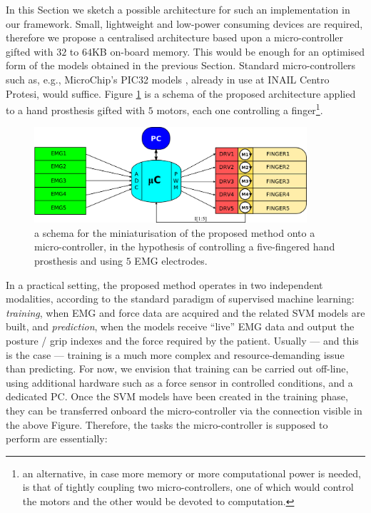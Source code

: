In this Section we sketch a possible architecture for such an
implementation in our framework. Small, lightweight and low-power
consuming devices are required, therefore we propose a centralised
architecture based upon a micro-controller gifted with $32$ to $64$KB
on-board memory. This would be enough for an optimised form of the
models obtained in the previous Section. Standard micro-controllers
such as, e.g., MicroChip's PIC32 models \cite{mc}, already in use at
INAIL Centro Protesi, would suffice. Figure \ref{fig:mc} is a schema
of the proposed architecture applied to a hand prosthesis gifted with
$5$ motors, each one controlling a finger\footnote{an alternative, in
case more memory or more computational power is needed, is that of
tightly coupling two micro-controllers, one of which would control the
motors and the other would be devoted to computation.}.

\begin{figure}[!ht] \centering
  \includegraphics[width=0.9\textwidth]{figs/mc}
  \caption{a schema for the miniaturisation of the proposed method
    onto a micro-controller, in the hypothesis of controlling a
    five-fingered hand prosthesis and using $5$ EMG electrodes.}
  \label{fig:mc}
\end{figure}

In a practical setting, the proposed method operates in two
independent modalities, according to the standard paradigm of
supervised machine learning: \emph{training}, when EMG and force data
are acquired and the related SVM models are built, and
\emph{prediction}, when the models receive ``live'' EMG data and
output the posture / grip indexes and the force required by the
patient. Usually --- and this is the case --- training is a much more
complex and resource-demanding issue than predicting. For now, we
envision that training can be carried out off-line, using additional
hardware such as a force sensor in controlled conditions, and a
dedicated PC. Once the SVM models have been created in the training
phase, they can be transferred onboard the micro-controller via the
connection visible in the above Figure. Therefore, the tasks the
micro-controller is supposed to perform are essentially:

